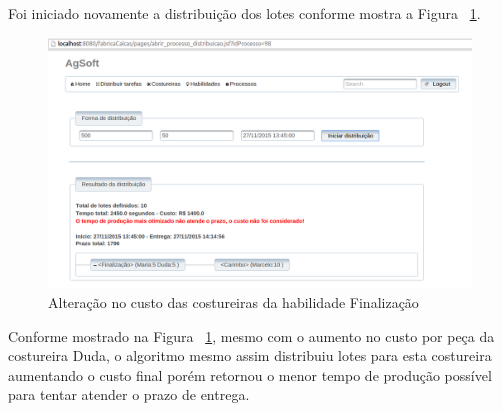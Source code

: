 \par Foi iniciado novamente a distribuição dos lotes conforme mostra a Figura
~\ref{fig:resultado2_teste6}.

\begin{figure}[h!]
	\centerline{\includegraphics[scale=0.3]{./imagens/resultado2_teste6.png}}
	\caption[Resultado da distribuição após alteração no custo da costureira Duda] 
	{Alteração no custo das costureiras da habilidade Finalização}
	\label{fig:resultado2_teste6}
\end{figure}

\par Conforme mostrado na Figura ~\ref{fig:resultado2_teste6}, mesmo com o
aumento no custo por peça da costureira Duda, o algoritmo mesmo assim distribuiu
lotes para esta costureira aumentando o custo final porém retornou o
menor tempo de produção possível para tentar atender o prazo de entrega.